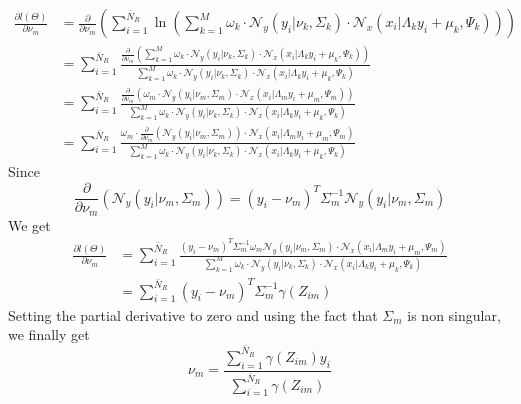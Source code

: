 \begin{align}
\frac{\partial l(\Theta)   }{\partial  \nu_m } &=\frac{\partial }{\partial \nu_m}\left( \sum\limits_{i = 1}^{\bar{N}_R}\ln\left(\sum\limits_{k = 1}^{M}\omega_k\cdot
\mathcal{N}_y\left(y_i\vert\nu_k,\Sigma_k\right)\cdot\mathcal{N}_x\left(x_i\vert\Lambda_ky_i + \mu_k,\Psi_k\right)\right)\right)\\
&= \sum\limits_{i = 1}^{\bar{N}_R}
\frac{\frac{\partial }{\partial \nu_m}\left(\sum\limits_{k = 1}^{M}\omega_k\cdot
\mathcal{N}_y\left(y_i\vert\nu_k,\Sigma_k\right)\cdot\mathcal{N}_x\left(x_i\vert\Lambda_ky_i + \mu_k,\Psi_k\right)\right)}{\sum\limits_{k = 1}^{M}\omega_k\cdot
\mathcal{N}_y\left(y_i\vert\nu_k,\Sigma_k\right)\cdot\mathcal{N}_x\left(x_i\vert\Lambda_ky_i + \mu_k,\Psi_k\right) }\\
&= \sum\limits_{i = 1}^{\bar{N}_R}
\frac{\frac{\partial }{\partial \nu_m}\left(\omega_m\cdot
\mathcal{N}_y\left(y_i\vert\nu_m,\Sigma_m\right)\cdot\mathcal{N}_x\left(x_i\vert\Lambda_my_i + \mu_m,\Psi_m\right)\right)}{\sum\limits_{k = 1}^{M}\omega_k\cdot
\mathcal{N}_y\left(y_i\vert\nu_k,\Sigma_k\right)\cdot\mathcal{N}_x\left(x_i\vert\Lambda_ky_i + \mu_k,\Psi_k\right) }\\
&= \sum\limits_{i = 1}^{\bar{N}_R}
\frac{\omega_m\cdot
\frac{\partial }{\partial \nu_m}\left(\mathcal{N}_y\left(y_i\vert\nu_m,\Sigma_m\right)\right)\cdot\mathcal{N}_x\left(x_i\vert\Lambda_my_i + \mu_m,\Psi_m\right)}{\sum\limits_{k = 1}^{M}\omega_k\cdot
\mathcal{N}_y\left(y_i\vert\nu_k,\Sigma_k\right)\cdot\mathcal{N}_x\left(x_i\vert\Lambda_ky_i + \mu_k,\Psi_k\right) }
\end{align}
Since
\begin{equation}
\frac{\partial }{\partial \nu_m}\left(\mathcal{N}_y\left(y_i\vert\nu_m,\Sigma_m\right)\right) = \left(y_i - \nu_m\right)^T\Sigma_m^{-1}\mathcal{N}_y\left(y_i\vert\nu_m,\Sigma_m\right)
\end{equation}
We get
\begin{align}
\frac{\partial l(\Theta)   }{\partial  \nu_m } & = \sum\limits_{i = 1}^{\bar{N}_R}
\frac{\left(y_i - \nu_m\right)^T\Sigma_m^{-1}
\omega_m \mathcal{N}_y\left(y_i\vert\nu_m,\Sigma_m\right)\cdot\mathcal{N}_x\left(x_i\vert\Lambda_my_i + \mu_m,\Psi_m\right)}{\sum\limits_{k = 1}^{M}\omega_k\cdot
\mathcal{N}_y\left(y_i\vert\nu_k,\Sigma_k\right)\cdot\mathcal{N}_x\left(x_i\vert\Lambda_ky_i + \mu_k,\Psi_k\right) }\\
&= \sum\limits_{i = 1}^{\bar{N}_R}
\left(y_i - \nu_m\right)^T\Sigma_m^{-1}\gamma\left(Z_{im}\right)
\end{align}
Setting the partial derivative to zero and using the fact that $\Sigma_m$ is non singular, we finally get
\begin{equation}
\boxed{
\nu_m = \frac{ \sum\limits_{i = 1}^{\bar{N}_R}\gamma\left(Z_{im}\right)y_i}{ \sum\limits_{i = 1}^{\bar{N}_R}\gamma\left(Z_{im}\right)}}
\end{equation}

